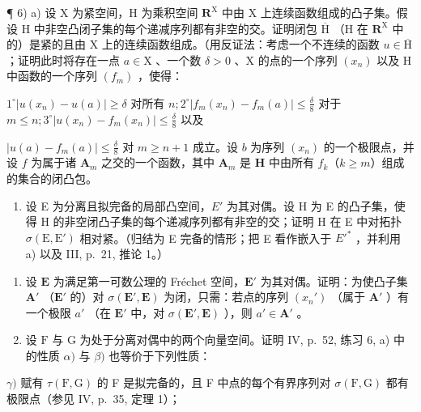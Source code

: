 ¶ 6) a) 设 X 为紧空间，H 为乘积空间 \(\mathbf{R}^{\mathrm{X}}\) 中由 X 上连续函数组成的凸子集。假设 H 中非空凸闭子集的每个递减序列都有非空的交。证明闭包 \(\overline{\mathrm{H}}\) （H 在 \(\mathbf{R}^{\mathrm{X}}\) 中的）是紧的且由 X 上的连续函数组成。（用反证法：考虑一个不连续的函数 \(u \in \overline{\mathrm{H}}\) ；证明此时将存在一点 \(a \in \mathrm{X}\) 、一个数 \(\delta > 0\) 、X 的点的一个序列 \((x_{n})\) 以及 H 中函数的一个序列 \((f_{m})\) ，使得：

\(1^{\circ}\left|u(x_{n}) - u(a)\right|\geqslant \delta\) 对所有 \(n;2^{\circ}\left|f_{m}(x_{n}) - f_{m}(a)\right|\leqslant \frac{\delta}{8}\) 对于 \(m\leqslant n;3^{\circ}\left|u(x_{n}) - f_{m}(x_{n})\right|\leqslant \frac{\delta}{8}\) 以及

\(\left|u(a) - f_m(a)\right| \leqslant \frac{\delta}{8}\) 对 \(m \geqslant n + 1\) 成立。设 \(b\) 为序列 \((x_n)\) 的一个极限点，并设 \(f\) 为属于诸 \(\mathbf{A}_m\) 之交的一个函数，其中 \(\mathbf{A}_m\) 是 \(\mathbf{H}\) 中由所有 \(f_k\)（\(k \geqslant m\)）组成的集合的闭凸包。

\begin{enumerate}
\def\labelenumi{\alph{enumi})}
\setcounter{enumi}{1}
\tightlist
\item
  设 E 为分离且拟完备的局部凸空间，\(E'\) 为其对偶。设 H 为 E 的凸子集，使得 H 的非空闭凸子集的每个递减序列都有非空的交；证明 H 在 E 中对拓扑 \(\sigma(\mathrm{E}, \mathrm{E}')\) 相对紧。（归结为 E 完备的情形；把 E 看作嵌入于 \(E'^{*}\) ，并利用 a) 以及 III, p.~21, 推论 1。）
\end{enumerate}

\begin{enumerate}
\def\labelenumi{\arabic{enumi})}
\setcounter{enumi}{6}
\item
  设 \(\mathbf{E}\) 为满足第一可数公理的 Fréchet 空间，\(\mathbf{E}'\) 为其对偶。证明：为使凸子集 \(\mathbf{A}'\) （\(\mathbf{E}'\) 的）对 \(\sigma(\mathbf{E}', \mathbf{E})\) 为闭，只需：若点的序列 \((x_n')\) （属于 \(\mathbf{A}'\) ）有一个极限 \(a'\) （在 \(\mathbf{E}'\) 中，对 \(\sigma(\mathbf{E}', \mathbf{E})\) ），则 \(a' \in \mathbf{A}'\) 。
\item
  设 \(\mathrm{F}\) 与 \(\mathrm{G}\) 为处于分离对偶中的两个向量空间。证明 IV, p.~52, 练习 6, a) 中的性质 \(\alpha)\) 与 \(\beta)\) 也等价于下列性质：
\end{enumerate}

\(\gamma)\) 赋有 \(\tau (\mathrm{F},\mathrm{G})\) 的 F 是拟完备的，且 F 中点的每个有界序列对 \(\sigma (\mathrm{F},\mathrm{G})\) 都有极限点（参见 IV, p.~35, 定理 1）；

